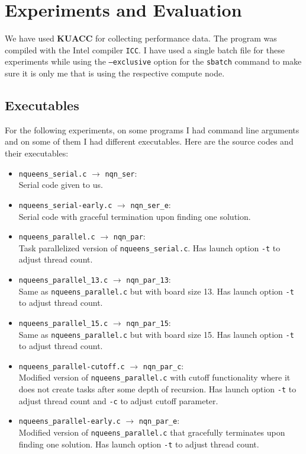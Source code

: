\documentclass[11pt,reqno]{amsart}
\newcommand{\code}[1]{\texttt{#1}}
\begin{document}
\section{Experiments and Evaluation}
We have used \textbf{KUACC} for collecting performance data. The program was compiled with the Intel compiler \code{ICC}. I have used a single batch file for these experiments while using the \code{--exclusive} option for the \code{sbatch} command to make sure it is only me that is using the respective compute node.

\subsection{Executables}
For the following experiments, on some programs I had command line arguments and on some of them I had different executables. Here are the source codes and their executables:
\begin{itemize}
\item \code{nqueens\_serial.c} $\xrightarrow{}$ \code{nqn\_ser}: \\
Serial code given to us.
\item \code{nqueens\_serial-early.c} $\xrightarrow{}$ \code{nqn\_ser\_e}: \\
Serial code with graceful termination upon finding one solution.
\item \code{nqueens\_parallel.c} $\xrightarrow{}$ \code{nqn\_par}: \\ 
Task parallelized version of \code{nqueens\_serial.c}. Has launch option \code{-t} to adjust thread count.
\item \code{nqueens\_parallel\_13.c} $\xrightarrow{}$ \code{nqn\_par\_13}: \\ 
Same as \code{nqueens\_parallel.c} but with board size 13. Has launch option \code{-t} to adjust thread count.
\item \code{nqueens\_parallel\_15.c} $\xrightarrow{}$ \code{nqn\_par\_15}: \\
Same as \code{nqueens\_parallel.c} but with board size 15. Has launch option \code{-t} to adjust thread count.
\item \code{nqueens\_parallel-cutoff.c} $\xrightarrow{}$ \code{nqn\_par\_c}: \\
Modified version of \code{nqueens\_parallel.c} with cutoff functionality where it does not create tasks after some depth of recursion. Has launch option \code{-t} to adjust thread count and \code{-c} to adjust cutoff parameter.
\item \code{nqueens\_parallel-early.c} $\xrightarrow{}$ \code{nqn\_par\_e}: \\
Modified version of \code{nqueens\_parallel.c} that gracefully terminates upon finding one solution. Has launch option \code{-t} to adjust thread count.
\end{itemize}
\end{document}
